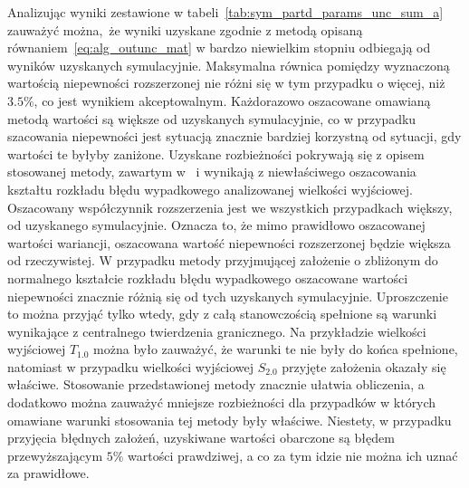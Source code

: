 Analizując wyniki zestawione w tabeli~\ref{tab:sym_partd_params_unc_sum_a} zauważyć można, że wyniki uzyskane zgodnie z metodą opisaną równaniem~\eqref{eq:alg_outunc_mat} w bardzo niewielkim stopniu odbiegają od wyników uzyskanych symulacyjnie. Maksymalna równica pomiędzy wyznaczoną wartością niepewności rozszerzonej nie różni się w tym przypadku o więcej, niż $3.5\%$, co jest wynikiem akceptowalnym. Każdorazowo oszacowane omawianą metodą wartości są większe od uzyskanych symulacyjnie, co w przypadku szacowania niepewności jest sytuacją znacznie bardziej korzystną od sytuacji, gdy wartości te byłyby zaniżone. Uzyskane rozbieżności pokrywają się z opisem stosowanej metody, zawartym w~\cite{jakubiec_redmono} i wynikają z niewłaściwego oszacowania kształtu rozkładu błędu wypadkowego analizowanej wielkości wyjściowej. Oszacowany współczynnik rozszerzenia jest we wszystkich przypadkach większy, od uzyskanego symulacyjnie. Oznacza to, że mimo prawidłowo oszacowanej wartości wariancji, oszacowana wartość niepewności rozszerzonej będzie większa od rzeczywistej. W przypadku metody przyjmującej założenie o zbliżonym do normalnego kształcie rozkładu błędu wypadkowego oszacowane wartości niepewności znacznie różnią się od tych uzyskanych symulacyjnie. Uproszczenie to można przyjąć tylko wtedy, gdy z całą stanowczością spełnione są warunki wynikające z centralnego twierdzenia granicznego. Na przykładzie wielkości wyjściowej $T_{1.0}$ można było zauważyć, że warunki te nie były do końca spełnione, natomiast w przypadku wielkości wyjściowej $S_{2.0}$ przyjęte założenia okazały się właściwe. Stosowanie przedstawionej metody znacznie ułatwia obliczenia, a dodatkowo można zauważyć mniejsze rozbieżności dla przypadków w których omawiane warunki stosowania tej metody były właściwe. Niestety, w przypadku przyjęcia błędnych założeń, uzyskiwane wartości obarczone są błędem przewyższającym $5\%$ wartości prawdziwej, a co za tym idzie nie można ich uznać za prawidłowe.

